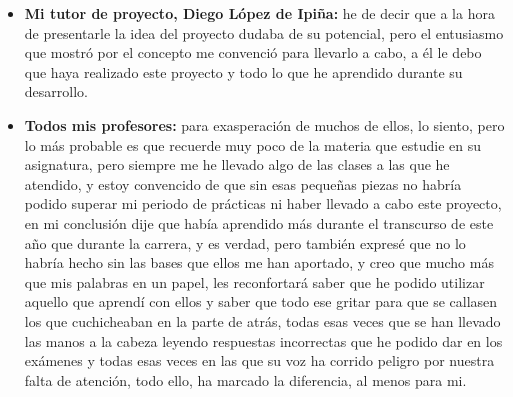 \begin{itemize}
\item \textbf{Mi tutor de proyecto, Diego López de Ipiña:} he de decir que a la hora de presentarle la idea del proyecto dudaba de su potencial, pero el entusiasmo que mostró por el concepto me convenció para llevarlo a cabo, a él le debo que haya realizado este proyecto y todo lo que he aprendido durante su desarrollo.
\item \textbf{Todos mis profesores:} para exasperación de muchos de ellos, lo siento, pero lo más probable es que recuerde muy poco de la materia que estudie en su asignatura, pero siempre me he llevado algo de las clases a las que he atendido, y estoy convencido de que sin esas pequeñas piezas no habría podido superar mi periodo de prácticas ni haber llevado a cabo este proyecto, en mi conclusión dije que había aprendido más durante el transcurso de este año que durante la carrera, y es verdad, pero también expresé que no lo habría hecho sin las bases que ellos me han aportado, y creo que mucho más que mis palabras en un papel, les reconfortará saber que he podido utilizar aquello que aprendí con ellos y saber que todo ese gritar para que se callasen los que cuchicheaban en la parte de atrás, todas esas veces que se han llevado las manos a la cabeza leyendo respuestas incorrectas que he podido dar en los exámenes y todas esas veces en las que su voz ha corrido peligro por nuestra falta de atención, todo ello, ha marcado la diferencia, al menos para mi.

\end{itemize}